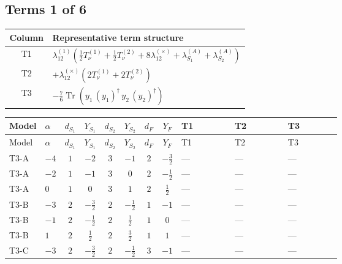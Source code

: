 \documentclass[8pt]{article}
\begin{document}
\begin{landscape}
\subsection*{Terms 1 of 6}
\begin{center}
\begin{tabular}{@{}c >{\raggedright\arraybackslash}p{0.82\linewidth}@{}}
\toprule
Column & Representative term structure \\
\midrule
T1 & \(\displaystyle {\lambda_{12}^{(1)}} \left(\frac{1}{2} T_{\nu}^{(1)}+\frac{1}{2} T_{\nu}^{(2)}+8 {\lambda_{12}^{(\times)}}+{\lambda_{S_1}^{(A)}}+{\lambda_{S_2}^{(A)}}\right)\) \\
\midrule
T2 & \(\displaystyle +{\lambda_{12}^{(\times)}} (2 T_{\nu}^{(1)}+2 T_{\nu}^{(2)})\) \\
\midrule
T3 & \(\displaystyle -\frac{7}{6} \operatorname{Tr}\!\left({y_1}\,\left({y_1}\right)^{\dagger}\,{y_2}\,\left({y_2}\right)^{\dagger}\right)\) \\
\midrule
\bottomrule
\end{tabular}
\end{center}
\smallskip
\tiny
\begin{longtable}{@{}llcccccc >{\raggedright\arraybackslash}p{0.21\linewidth} >{\raggedright\arraybackslash}p{0.21\linewidth} >{\raggedright\arraybackslash}p{0.21\linewidth}@{}}
\toprule
Model & $\alpha$ & $d_{S_1}$ & $Y_{S_1}$ & $d_{S_2}$ & $Y_{S_2}$ & $d_F$ & $Y_F$ & T1 & T2 & T3 \\
\midrule
\endfirsthead
\toprule
Model & $\alpha$ & $d_{S_1}$ & $Y_{S_1}$ & $d_{S_2}$ & $Y_{S_2}$ & $d_F$ & $Y_F$ & T1 & T2 & T3 \\
\midrule
\endhead
T3-A & $-4$ & $1$ & $-2$ & $3$ & $-1$ & $2$ & $-\frac{3}{2}$ & --- & --- & --- \\
\midrule
T3-A & $-2$ & $1$ & $-1$ & $3$ & $0$ & $2$ & $-\frac{1}{2}$ & --- & --- & --- \\
\midrule
T3-A & $0$ & $1$ & $0$ & $3$ & $1$ & $2$ & $\frac{1}{2}$ & --- & --- & --- \\
\midrule
T3-B & $-3$ & $2$ & $-\frac{3}{2}$ & $2$ & $-\frac{1}{2}$ & $1$ & $-1$ & --- & --- & --- \\
\midrule
T3-B & $-1$ & $2$ & $-\frac{1}{2}$ & $2$ & $\frac{1}{2}$ & $1$ & $0$ & --- & --- & --- \\
\midrule
T3-B & $1$ & $2$ & $\frac{1}{2}$ & $2$ & $\frac{3}{2}$ & $1$ & $1$ & --- & --- & --- \\
\midrule
T3-C & $-3$ & $2$ & $-\frac{3}{2}$ & $2$ & $-\frac{1}{2}$ & $3$ & $-1$ & --- & --- & --- \\

\end{longtable}
\end{landscape}
\end{document}
